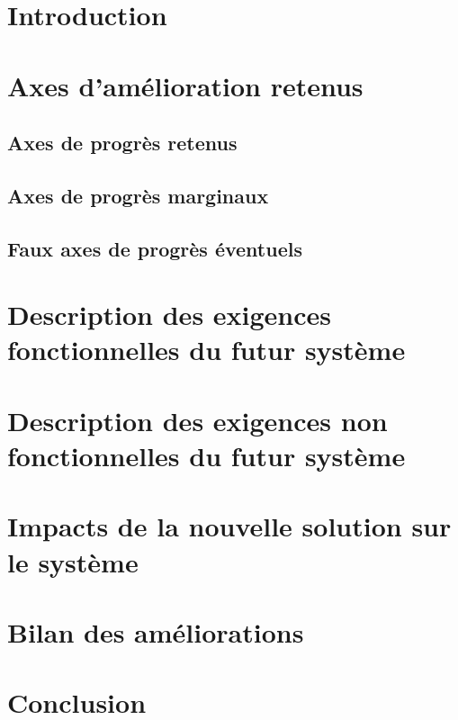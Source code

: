 \section{Introduction}
\section{Axes d'amélioration retenus}
\subsection{Axes de progrès retenus}
\subsection{Axes de progrès marginaux}
\subsection{Faux axes de progrès éventuels}
\section{Description des exigences fonctionnelles du futur système}
\section{Description des exigences non fonctionnelles du futur système}
\section{Impacts de la nouvelle solution sur le système}
\section{Bilan des améliorations}
\section{Conclusion}